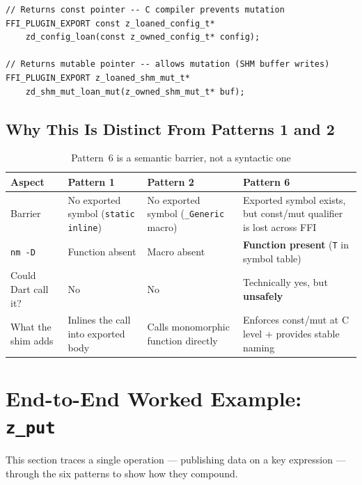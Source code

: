 \documentclass[11pt,a4paper]{article}
\newcommand{\code}[1]{\texttt{#1}}
\begin{document}
\begin{lstlisting}[style=cstyle,caption={Loan wrappers enforce const at the C level}]
// Returns const pointer -- C compiler prevents mutation
FFI_PLUGIN_EXPORT const z_loaned_config_t*
    zd_config_loan(const z_owned_config_t* config);

// Returns mutable pointer -- allows mutation (SHM buffer writes)
FFI_PLUGIN_EXPORT z_loaned_shm_mut_t*
    zd_shm_mut_loan_mut(z_owned_shm_mut_t* buf);
\end{lstlisting}

\subsection{Why This Is Distinct From Patterns 1 and 2}

\begin{table}[ht]
\centering\footnotesize
\begin{tabularx}{\textwidth}{lLLL}
  \toprule
  \textbf{Aspect} & \textbf{Pattern 1} & \textbf{Pattern 2} & \textbf{Pattern 6} \\
  \midrule
  Barrier & No exported symbol (\code{static inline}) & No exported symbol (\code{\_Generic} macro) & Exported symbol exists, but const/mut qualifier is lost across FFI \\[4pt]
  \code{nm -D} & Function absent & Macro absent & \textbf{Function present} (\code{T} in symbol table) \\[4pt]
  Could Dart call it? & No & No & Technically yes, but \textbf{unsafely} \\[4pt]
  What the shim adds & Inlines the call into exported body & Calls monomorphic function directly & Enforces const/mut at C level + provides stable naming \\
  \bottomrule
\end{tabularx}
\caption{Pattern~6 is a semantic barrier, not a syntactic one}
\label{tab:p6-vs-p1-p2}
\end{table}


\section{End-to-End Worked Example: \code{z\_put}}
\label{sec:worked-example}

This section traces a single operation --- publishing data on a key expression
--- through the six patterns to show how they compound.
\end{document}
